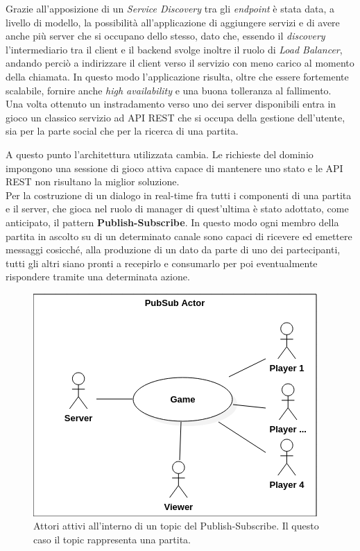             Grazie all'apposizione di un \textit{Service Discovery} tra gli \textit{endpoint} è stata data, a livello di modello, la possibilità all'applicazione di aggiungere servizi e di avere anche più server che si occupano dello stesso, dato che, essendo il \textit{discovery} l'intermediario tra il client e il backend svolge inoltre il ruolo di \textit{Load Balancer}, andando perciò a indirizzare il client verso il servizio con meno carico al momento della chiamata.
            In questo modo l'applicazione risulta, oltre che essere fortemente scalabile, fornire anche \textit{high availability} e una buona tolleranza al fallimento. 
            \\
            Una volta ottenuto un instradamento verso uno dei server disponibili entra in gioco un classico servizio ad API REST che si occupa della gestione dell'utente, sia per la parte social che per la ricerca di una partita. 
            
            A questo punto l'architettura utilizzata cambia. Le richieste del dominio impongono una sessione di gioco attiva capace di mantenere uno stato e le API REST non risultano la miglior soluzione. \\ 
            Per la costruzione di un dialogo in real-time fra tutti i componenti di una partita e il server, che gioca nel ruolo di manager di quest'ultima è stato adottato, come anticipato, il pattern \textbf{Publish-Subscribe}. 
            In questo modo ogni membro della partita in ascolto su di un determinato canale sono capaci di ricevere ed emettere messaggi cosicché, alla produzione di un dato da parte di uno dei partecipanti, tutti gli altri siano pronti a recepirlo e consumarlo per poi eventualmente rispondere tramite una determinata azione.
            
            \begin{figure}[h!]
                \includegraphics[scale=0.6]{images/PubSubActorDiagram.png}
                \caption{Attori attivi all'interno di un topic del Publish-Subscribe. Il questo caso il topic rappresenta una partita.}
            \end{figure}
            
